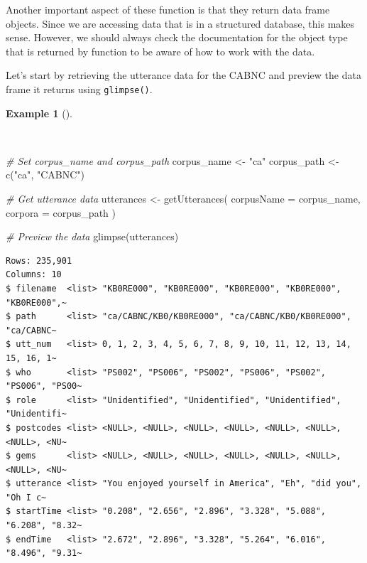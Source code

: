 \documentclass[
  letterpaper,
]{book}
\newenvironment{Shaded}{\begin{snugshade}}{\end{snugshade}}
\newcommand{\AttributeTok}[1]{\textcolor[rgb]{0.00,0.00,0.00}{#1}}
\newcommand{\CommentTok}[1]{\textcolor[rgb]{0.00,0.00,0.00}{\textit{#1}}}
\newcommand{\FunctionTok}[1]{\textcolor[rgb]{0.00,0.00,0.00}{#1}}
\newcommand{\NormalTok}[1]{\textcolor[rgb]{0.00,0.00,0.00}{#1}}
\newcommand{\OtherTok}[1]{\textcolor[rgb]{0.00,0.00,0.00}{#1}}
\newcommand{\StringTok}[1]{\textcolor[rgb]{0.00,0.00,0.00}{#1}}
\theoremstyle{definition}
\newtheorem{example}{Example}[chapter]
\theoremstyle{remark}
\begin{document}
Another important aspect of these function is that they return data
frame objects. Since we are accessing data that is in a structured
database, this makes sense. However, we should always check the
documentation for the object type that is returned by function to be
aware of how to work with the data.

Let's start by retrieving the utterance data for the CABNC and preview
the data frame it returns using \texttt{glimpse()}.

\begin{example}[]\protect\hypertarget{exm-acquire-get-utterances}{}\label{exm-acquire-get-utterances}

~

\begin{Shaded}
\begin{Highlighting}[]
\CommentTok{\# Set corpus\_name and corpus\_path}
\NormalTok{corpus\_name }\OtherTok{\textless{}{-}} \StringTok{"ca"}
\NormalTok{corpus\_path }\OtherTok{\textless{}{-}} \FunctionTok{c}\NormalTok{(}\StringTok{"ca"}\NormalTok{, }\StringTok{"CABNC"}\NormalTok{)}

\CommentTok{\# Get utterance data}
\NormalTok{utterances }\OtherTok{\textless{}{-}}
  \FunctionTok{getUtterances}\NormalTok{(}
    \AttributeTok{corpusName =}\NormalTok{ corpus\_name,}
    \AttributeTok{corpora =}\NormalTok{ corpus\_path}
\NormalTok{    )}

\CommentTok{\# Preview the data}
\FunctionTok{glimpse}\NormalTok{(utterances)}
\end{Highlighting}
\end{Shaded}

\begin{verbatim}
Rows: 235,901
Columns: 10
$ filename  <list> "KB0RE000", "KB0RE000", "KB0RE000", "KB0RE000", "KB0RE000",~
$ path      <list> "ca/CABNC/KB0/KB0RE000", "ca/CABNC/KB0/KB0RE000", "ca/CABNC~
$ utt_num   <list> 0, 1, 2, 3, 4, 5, 6, 7, 8, 9, 10, 11, 12, 13, 14, 15, 16, 1~
$ who       <list> "PS002", "PS006", "PS002", "PS006", "PS002", "PS006", "PS00~
$ role      <list> "Unidentified", "Unidentified", "Unidentified", "Unidentifi~
$ postcodes <list> <NULL>, <NULL>, <NULL>, <NULL>, <NULL>, <NULL>, <NULL>, <NU~
$ gems      <list> <NULL>, <NULL>, <NULL>, <NULL>, <NULL>, <NULL>, <NULL>, <NU~
$ utterance <list> "You enjoyed yourself in America", "Eh", "did you", "Oh I c~
$ startTime <list> "0.208", "2.656", "2.896", "3.328", "5.088", "6.208", "8.32~
$ endTime   <list> "2.672", "2.896", "3.328", "5.264", "6.016", "8.496", "9.31~
\end{verbatim}

\end{example}
\end{document}

